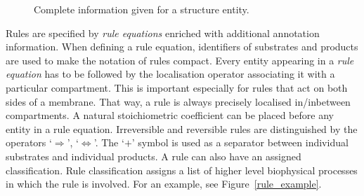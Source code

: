 \documentclass[12pt]{fithesis2}
\begin{document}
\begin{figure}[!h]
\begin{center}
\end{center}
\caption{Complete information given for a structure entity.}\label{structure_example}
\end{figure}

Rules are specified by \emph{rule equations} enriched with additional annotation information. When defining a rule equation, identifiers of substrates and products are used to make the notation of rules compact. Every entity appearing in a \emph{rule equation} has to be followed by the localisation operator associating it with a particular compartment. This is important especially for rules that act on both sides of a membrane. That way, a rule is always precisely localised in/inbetween compartments. A natural stoichiometric coefficient can be placed before any entity in a rule equation. Irreversible and reversible rules are distinguished by the operators `$\Rightarrow$', `$\Leftrightarrow$'. The `$+$' symbol is used as a separator between individual substrates and individual products. A rule can also have an assigned classification. Rule classification assigns a list of higher level biophysical processes in which the rule is involved. For an example, see Figure~\ref{rule_example}.
\end{document}
